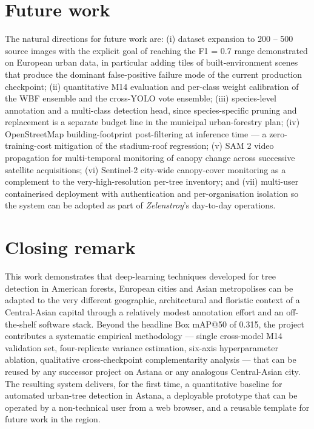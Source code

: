 \section{Future work}\label{future-work}

The natural directions for future work are: (i) dataset expansion to 200 -- 500 source images with the explicit goal of reaching the F1 = 0.7 range demonstrated on European urban data, in particular adding tiles of built-environment scenes that produce the dominant false-positive failure mode of the current production checkpoint; (ii) quantitative M14 evaluation and per-class weight calibration of the WBF ensemble and the cross-YOLO vote ensemble; (iii) species-level annotation and a multi-class detection head, since species-specific pruning and replacement is a separate budget line in the municipal urban-forestry plan; (iv) OpenStreetMap building-footprint post-filtering at inference time --- a zero-training-cost mitigation of the stadium-roof regression; (v) SAM 2 video propagation for multi-temporal monitoring of canopy change across successive satellite acquisitions; (vi) Sentinel-2 city-wide canopy-cover monitoring as a complement to the very-high-resolution per-tree inventory; and (vii) multi-user containerised deployment with authentication and per-organisation isolation so the system can be adopted as part of \emph{Zelenstroy}'s day-to-day operations.

\section{Closing remark}\label{closing-remark}

This work demonstrates that deep-learning techniques developed for tree detection in American forests, European cities and Asian metropolises can be adapted to the very different geographic, architectural and floristic context of a Central-Asian capital through a relatively modest annotation effort and an off-the-shelf software stack. Beyond the headline Box mAP@50 of 0.315, the project contributes a systematic empirical methodology --- single cross-model M14 validation set, four-replicate variance estimation, six-axis hyperparameter ablation, qualitative cross-checkpoint complementarity analysis --- that can be reused by any successor project on Astana or any analogous Central-Asian city. The resulting system delivers, for the first time, a quantitative baseline for automated urban-tree detection in Astana, a deployable prototype that can be operated by a non-technical user from a web browser, and a reusable template for future work in the region.

\newpage

